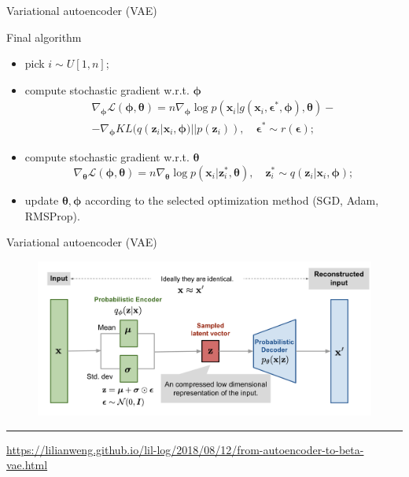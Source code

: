 \documentclass{beamer}
\newcommand{\bx}{\mathbf{x}}
\newcommand{\bz}{\mathbf{z}}
\newcommand{\bepsilon}{\boldsymbol{\epsilon}}
\newcommand{\bphi}{\boldsymbol{\phi}}
\newcommand{\btheta}{\boldsymbol{\theta}}
\begin{document}
\begin{frame}{Variational autoencoder (VAE)}
	\begin{block}{Final algorithm}
		\begin{itemize}
			\item pick $i \sim U[1, n]$;
			\item compute stochastic gradient w.r.t. $\bphi$
				\begin{multline*}
					\nabla_{\bphi} \mathcal{L} (\bphi, \btheta) = n \nabla_{\bphi} \log p(\bx_i | g(\bx_i, \bepsilon^*, \bphi), \btheta) - \\ - \nabla_{\bphi} KL (q(\bz_i|\bx_i, \bphi) || p(\bz_i)), \quad \bepsilon^* \sim r(\bepsilon);
				\end{multline*}
			\item compute stochastic gradient w.r.t. $\btheta$
			\[
			\nabla_{\btheta} \mathcal{L} (\bphi, \btheta) = n \nabla_{\btheta} \log p(\bx_i|\bz^*_i, \btheta), \quad \bz^*_i \sim q(\bz_i|\bx_i, \bphi);
			\]
			\item update $\btheta, \bphi$ according to the selected optimization method (SGD, Adam, RMSProp).
		\end{itemize}
	\end{block}
\end{frame}
\begin{frame}{Variational autoencoder (VAE)}

\begin{figure}[h]
	\centering
	\includegraphics[width=\linewidth]{figs/vae-gaussian.png}
\end{figure}
 \hrule\medskip
{\scriptsize \href{https://lilianweng.github.io/lil-log/2018/08/12/from-autoencoder-to-beta-vae.html}{https://lilianweng.github.io/lil-log/2018/08/12/from-autoencoder-to-beta-vae.html}}
\end{frame}
\end{document}
